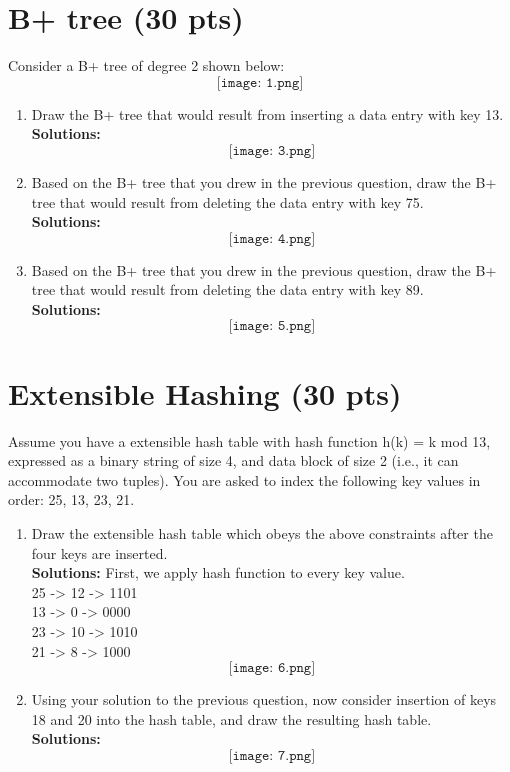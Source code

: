 \documentclass[paper=a4, fontsize=11pt]{scrartcl}
\numberwithin{equation}{section}		%
\numberwithin{figure}{section}			%
\numberwithin{table}{section}				%
\begin{document}
	
	\section{B+ tree (30 pts)}
	Consider a B+ tree of degree 2 shown below:
	\[
	\texttt{[image: 1.png]}
	\]
	
	\begin{enumerate}
		\item Draw the B+ tree that would result from inserting a data entry with key 13.\\
		\textbf{Solutions: }
		\[
		\texttt{[image: 3.png]}
		\]
		
		\item Based on the B+ tree that you drew in the previous question, draw the B+ tree that would result from deleting the data entry with key 75.\\
		\textbf{Solutions: }
		\[
		\texttt{[image: 4.png]}
		\]
		
		\item Based on the B+ tree that you drew in the previous question, draw the B+ tree that would result from deleting the data entry with key 89.\\
		\textbf{Solutions: }
		\[
		\texttt{[image: 5.png]}
		\]
		
	\end{enumerate}
	
	
	\section{Extensible Hashing (30 pts)}
	
	Assume you have a extensible hash table with hash function h(k) = k mod 13, expressed as a binary string of size 4, and data block of size 2 (i.e., it can accommodate two tuples). You are asked to index the following key values in order: 25, 13, 23, 21.
	
	\begin{enumerate}
		\item Draw the extensible hash table which obeys the above constraints after the four keys are inserted.\\
		\textbf{Solutions: }
		First, we apply hash function to every key value.\\
		25 -> 12 -> 1101 \\
		13 -> 0 -> 0000 \\
		23 -> 10 -> 1010 \\
		21 -> 8 -> 1000 \\
		\[
		\texttt{[image: 6.png]}
		\]
		
		
		\item Using your solution to the previous question, now consider insertion of keys 18 and 20 into the hash table, and draw the resulting hash table.\\
		\textbf{Solutions: }
		\[
		\texttt{[image: 7.png]}
		\]
		
	\end{enumerate}
	
\end{document}
